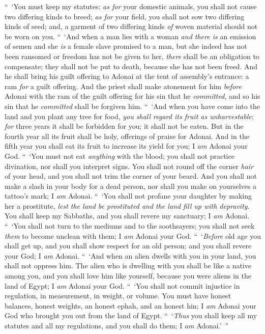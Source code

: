 \begin{biblechapter}
 “ ‘You must keep my statutes: \textit{as for} your domestic animals, you shall not cause two differing kinds to breed; \textit{as for} your field, you shall not sow two differing kinds of seed; and, a garment of two differing kinds \textit{of} woven material should not be worn on you.
\verse “ ‘And when a man lies with a woman \textit{and there is} an emission of semen and she \textit{is} a female slave promised to a man, but she indeed has not been ransomed or freedom has not be given to her, \textit{there} shall be an obligation to compensate; they shall not be put to death, because she has not been freed.
\verse And he shall bring his guilt offering to Adonai at the tent of assembly’s entrance: a ram \textit{for} a guilt offering.
\verse And the priest shall make atonement for him \textit{before} Adonai with the ram of the guilt offering for his sin that he \textit{committed}, and so his sin that he \textit{committed} shall be forgiven him.
\verse “ ‘And when you have come into the land and you plant any tree for food, \textit{you shall regard its fruit as unharvestable}; \textit{for} three years it shall be forbidden for you;  it shall not be eaten.
\verse But in the fourth year all its fruit shall be holy, offerings of praise for Adonai.
\verse And in the fifth year you shall eat its fruit to increase its yield for you;  I \textit{am} Adonai your God.
\verse “ ‘You must not eat \textit{anything} with the blood; you shall not practice divination, nor shall you interpret signs.
\verse You shall not round off the corner \textit{hair} of your head, and you shall not trim the corner of your beard.
\verse And you shall not make a slash in your body for a dead person, nor shall you make on yourselves a tattoo’s mark; I \textit{am} Adonai.
\verse “ ‘You shall not profane your daughter by making her a prostitute, \textit{lest the land be prostituted and the land fill up with depravity}.
\verse You shall keep my Sabbaths, and you shall revere my sanctuary; I \textit{am} Adonai.
\verse “ ‘You shall not turn to the mediums and to the soothsayers; you shall not seek \textit{them} to become unclean with them; I \textit{am} Adonai your God.
\verse “ ‘\textit{Before} old age you shall get up, and you shall show respect for an old person; and you shall revere your God; I \textit{am} Adonai.
\verse “ ‘And when an alien dwells with you in your land, you shall not oppress him.
\verse The alien who is dwelling with you shall be like a native among you, and you shall love him like yourself,  because you were aliens in the land of Egypt; I \textit{am} Adonai your God.
\verse “ ‘You shall not commit injustice in regulation, in measurement, in weight, or volume.
\verse You must have honest balances, honest weights, an honest ephah, and an honest hin; I \textit{am} Adonai your God who brought you out from the land of Egypt.
\verse “ ‘\textit{Thus} you shall keep all my statutes and all my regulations, and you shall do them; I \textit{am} Adonai.’ ”
\end{biblechapter}


